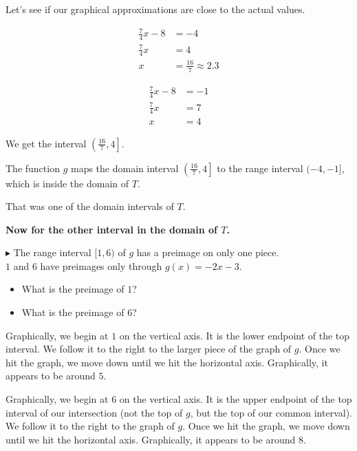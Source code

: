 \documentclass{ximera}
\begin{document}
Let's see if our graphical approximations are close to the actual values.




\begin{align*}
\frac{7}{4}x - 8 & = -4 \\
\frac{7}{4}x     & = 4   \\
x                & = \frac{16}{7} \approx 2.3
\end{align*}

\begin{align*}
\frac{7}{4}x - 8 & = -1 \\
\frac{7}{4}x     & = 7   \\
x                & = 4
\end{align*} 




We get the interval $\left( \frac{16}{7}, 4 \right]$.


The function $g$ maps the domain interval $\left( \frac{16}{7}, 4 \right]$ to the range interval $(-4,-1]$, which is inside the domain of $T$.




That was one of the domain intervals of $T$.


\textbf{\textcolor{red!75!green}{Now for the other interval in the domain of $T$.}} 



$\blacktriangleright$ The range interval $[1, 6)$ of $g$ has a preimage on only one piece. \\
$1$ and $6$ have preimages only through $g(x) = -2x-3$.





\begin{itemize}
\item What is the preimage of $1$? 
\item What is the preimage of $6$? 
\end{itemize}



Graphically, we begin at $1$ on the vertical axis.  It is the lower endpoint of the top interval.  We follow it to the right to the larger piece of the graph of $g$.  Once we hit the graph, we move down until we hit the horizontal axis.  Graphically, it appears to be around $5$.


Graphically, we begin at $6$ on the vertical axis.  It is the upper endpoint of the top interval of our intersection (not the top of $g$, but the top of our common interval).  We follow it to the right to the graph of $g$.  Once we hit the graph, we move down until we hit the horizontal axis.  Graphically, it appears to be around $8$.
\end{document}
